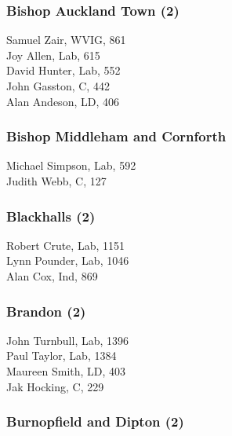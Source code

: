 \documentclass[a4paper,openany,10pt]{book}
\begin{document}
\subsubsection*{Bishop Auckland Town (2)}



Samuel Zair, WVIG, 861\\
Joy Allen, Lab, 615\\
David Hunter, Lab, 552\\
John Gasston, C, 442\\
Alan Andeson, LD, 406\\


\subsubsection*{Bishop Middleham and Cornforth}



Michael Simpson, Lab, 592\\
Judith Webb, C, 127\\


\subsubsection*{Blackhalls (2)}



Robert Crute, Lab, 1151\\
Lynn Pounder, Lab, 1046\\
Alan Cox, Ind, 869\\


\subsubsection*{Brandon (2)}



John Turnbull, Lab, 1396\\
Paul Taylor, Lab, 1384\\
Maureen Smith, LD, 403\\
Jak Hocking, C, 229\\


\subsubsection*{Burnopfield and Dipton (2)}
\end{document}
